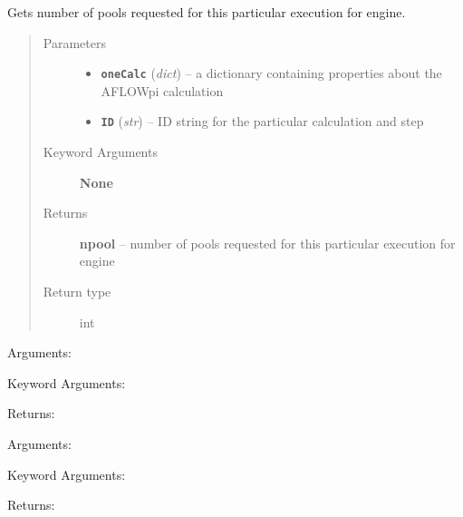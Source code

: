 \documentclass[letterpaper,10pt,english]{sphinxmanual}
\begin{document}

\begin{fulllineitems}
\label{retr:retr.__get_pool_num}
Gets number of pools requested for this particular execution for engine.
\begin{quote}\begin{description}
\item[{Parameters}] \leavevmode\begin{itemize}
\item {} 
\textbf{\texttt{oneCalc}} (\emph{dict}) -- a dictionary containing properties about the AFLOWpi calculation

\item {} 
\textbf{\texttt{ID}} (\emph{str}) -- ID string for the particular calculation and step

\end{itemize}

\item[{Keyword Arguments}] \leavevmode
\textbf{None}

\item[{Returns}] \leavevmode
\textbf{npool} --
number of pools requested for this particular execution for engine

\item[{Return type}] \leavevmode
int

\end{description}\end{quote}

\end{fulllineitems}


\begin{fulllineitems}
\label{retr:retr.__invertX}
Arguments:

Keyword Arguments:

Returns:

\end{fulllineitems}


\begin{fulllineitems}
\label{retr:retr.__invertXYZ}
Arguments:

Keyword Arguments:

Returns:

\end{fulllineitems}
\end{document}
